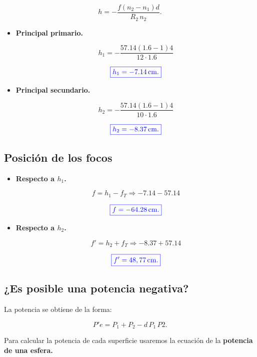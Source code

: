 \documentclass[a4paper,12pt]{article} %
\begin{document}
\[ h = - \frac{f\left(n_2 - n_1\right)d}{R_2 \, n_2}. \]

\begin{itemize}
	\item \textbf{Principal primario.}
	
	\[h_1 = - \frac{57.14 \left(1.6-1\right)4}{12 \cdot 1.6}\]

	\[\textcolor{blue}{\boxed{h_1 = -7.14 \, \mathrm{cm}.}}\]

	\item \textbf{Principal secundario.}

	\[h_2 = - \frac{57.14 \left(1.6-1\right)4}{10 \cdot 1.6}\]

	\[\textcolor{blue}{\boxed{h_2 = -8.37 \, \mathrm{cm}.}}\]
\end{itemize}

\vspace{\baselineskip}

\subsection{Posición de los focos}

\begin{itemize}
	\item \textbf{Respecto a \(h_1\).}
	
	\[f = h_1 - f_T \Rightarrow -7.14 - 57.14\]

	\[\textcolor{blue}{\boxed{f = -64.28 \, \mathrm{cm}.}}\]

	\item \textbf{Respecto a \(h_2\).}
	
	\[f' = h_2 + f_T \Rightarrow -8.37 + 57.14\]

	\[\textcolor{blue}{\boxed{f' = 48,77 \, \mathrm{cm}.}}\]
\end{itemize}

\vspace{\baselineskip}

\subsection{¿Es posible una potencia negativa?}

\begin{justify}
	La potencia se obtiene de la forma:
\end{justify}

\[ P'e = P_1 + P_2 - d \, P_1 \, P2. \]

\begin{justify}
	Para calcular la potencia de cada superficie usaremos la ecuación de la \textbf{potencia de una esfera.}
\end{justify}
\end{document}
